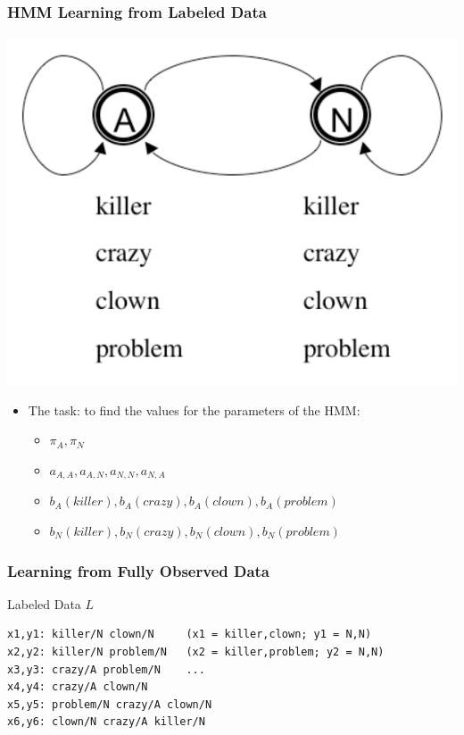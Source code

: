 \begin{frame}
\frametitle{HMM Learning from Labeled Data}
\begin{center}
\includegraphics[scale=.4]{figures/hmmfig}
\end{center}
\begin{itemize}[<+->]
\item The task: to find the values for the parameters of the HMM:
\begin{itemize}
\item $\pi_A, \pi_N$
\item $a_{A,A}, a_{A,N}, a_{N,N}, a_{N,A}$
\item $b_A(\textit{killer}), b_A(\textit{crazy}), b_A(\textit{clown}), b_A(\textit{problem})$
\item $b_N(\textit{killer}), b_N(\textit{crazy}), b_N(\textit{clown}), b_N(\textit{problem})$
\end{itemize}
\end{itemize}
\end{frame}

\begin{frame}[fragile]
\frametitle{Learning from Fully Observed Data}
\begin{block}{Labeled Data $L$}
\begin{verbatim}
x1,y1: killer/N clown/N     (x1 = killer,clown; y1 = N,N)
x2,y2: killer/N problem/N   (x2 = killer,problem; y2 = N,N)
x3,y3: crazy/A problem/N    ...
x4,y4: crazy/A clown/N
x5,y5: problem/N crazy/A clown/N
x6,y6: clown/N crazy/A killer/N
\end{verbatim}
\end{block}
\end{frame}

